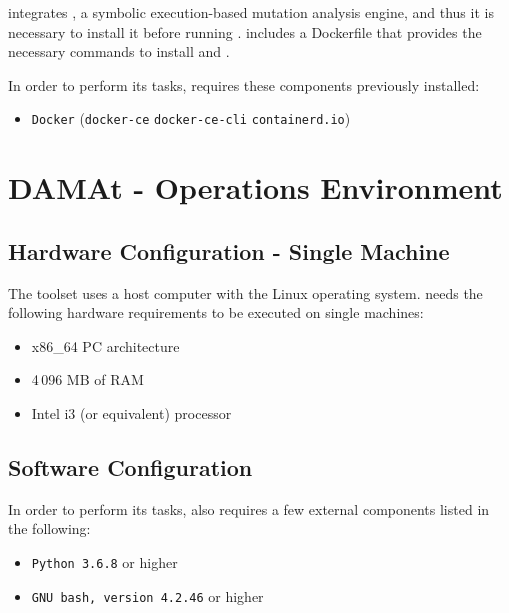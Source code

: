 \SEMUS integrates \SEMU, a symbolic execution-based mutation analysis engine, and thus it is necessary to install it before running \SEMUS. \SEMUS includes a Dockerfile that provides the necessary commands to install \SEMU and \SEMUS.

In order to perform its tasks, \SEMUS requires these components previously installed:

\begin{itemize}
	\item \texttt{Docker} (\texttt{docker-ce} \texttt{docker-ce-cli} \texttt{containerd.io})
\end{itemize}


\chapter{DAMAt - Operations Environment}
\label{chapter:dama:operationsEnv}

\section{Hardware Configuration - Single Machine}

The \DAMA toolset uses a host computer with the Linux operating system. \DAMA needs the following hardware requirements to be executed on single machines:

\begin{itemize}
	\item x86\_64 PC architecture
	\item 4\,096 MB of RAM
	\item Intel i3 (or equivalent) processor
\end{itemize}

%
%

\section{Software Configuration}

In order to perform its tasks, \DAMA also requires a few external components listed in the following:

\begin{itemize}
	\item \texttt{Python 3.6.8} or higher
	\item \texttt{GNU bash, version 4.2.46} or higher
\end{itemize}
